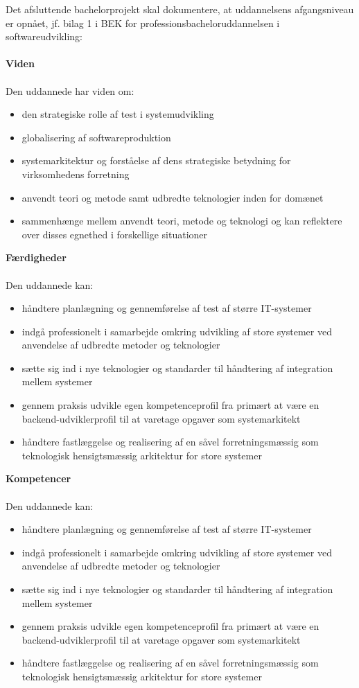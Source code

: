 \documentclass[a4paper,12pt]{article}
\begin{document}
Det afsluttende bachelorprojekt skal dokumentere, at uddannelsens afgangsniveau er opnået, jf. bilag 1 i BEK for professionsbacheloruddannelsen i softwareudvikling: \\
\\
\textbf{Viden} \\ \\
Den uddannede har viden om:
\begin{itemize}
\item den strategiske rolle af test i systemudvikling
\item globalisering af softwareproduktion
\item systemarkitektur og forståelse af dens strategiske betydning for virksomhedens forretning
\item anvendt teori og metode samt udbredte teknologier inden for domænet
\item sammenhænge mellem anvendt teori, metode og teknologi og kan reflektere over disses egnethed i forskellige situationer
\end{itemize}
\vspace{1cm}
\textbf{Færdigheder}  \\ \\
Den uddannede kan:
\begin{itemize}
\item håndtere planlægning og gennemførelse af test af større IT-systemer
\item indgå professionelt i samarbejde omkring udvikling af store systemer ved anvendelse af udbredte metoder og teknologier
\item sætte sig ind i nye teknologier og standarder til håndtering af integration mellem systemer

\item gennem praksis udvikle egen kompetenceprofil fra primært at være en backend-udviklerprofil til at varetage opgaver som
systemarkitekt
\item håndtere fastlæggelse og realisering af en såvel forretningsmæssig som teknologisk hensigtsmæssig arkitektur for store systemer

\end{itemize}
\vspace{1cm}
\textbf{Kompetencer} \\
\\
Den uddannede kan:
\begin{itemize}
\item håndtere planlægning og gennemførelse af test af større IT-systemer
\item indgå professionelt i samarbejde omkring udvikling af store systemer ved
anvendelse af udbredte metoder og teknologier
\item sætte sig ind i nye teknologier og standarder til håndtering af integration
mellem systemer
\item gennem praksis udvikle egen kompetenceprofil fra primært at være en
backend-udviklerprofil til at varetage opgaver som systemarkitekt
\item håndtere fastlæggelse og realisering af en såvel forretningsmæssig som
teknologisk hensigtsmæssig arkitektur for store systemer
\end{itemize}
\end{document}
